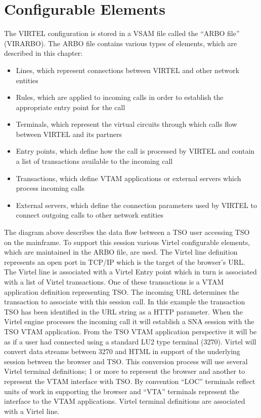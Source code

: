 \documentclass[letterpaper,10pt,english]{sphinxmanual}
\begin{document}
\section{Configurable Elements}
\label{\detokenize{connectivity_guide:configurable-elements}}
The VIRTEL configuration is stored in a VSAM file called the “ARBO file” (VIRARBO). The ARBO file contains various types of elements, which are described in this chapter:
\begin{itemize}
\item {} 
Lines, which represent connections between VIRTEL and other network entities

\item {} 
Rules, which are applied to incoming calls in order to establish the appropriate entry point for the call

\item {} 
Terminals, which represent the virtual circuits through which calls flow between VIRTEL and its partners

\item {} 
Entry points, which define how the call is processed by VIRTEL and contain a list of transactions available to the incoming call

\item {} 
Transactions, which define VTAM applications or external servers which process incoming calls

\item {} 
External servers, which define the connection parameters used by VIRTEL to connect outgoing calls to other network entities

\end{itemize}



The diagram above describes the data flow between a TSO user accessing TSO on the mainframe. To support this session various Virtel configurable elements, which are maintained in the ARBO file, are used. The Virtel line definition represents an open port in TCP/IP which is the target of the browser’s URL. The Virtel line is associated with a Virtel Entry point which in turn is associated with a list of Virtel transactions. One of these transactions is a VTAM application definition representing TSO. The incoming URL determines the transaction to associate with this session call. In this example the transaction TSO has been identified in the URL string as a HTTP parameter. When the Virtel engine processes the incoming call it will establish a SNA session with the TSO VTAM application. From the TSO VTAM application perspective it will be as if a user had connected using a standard LU2 type terminal (3270). Virtel will convert data streams between 3270 and HTML in support of the underlying session between the browser and TSO. This conversion process will use several Virtel terminal definitions; 1 or more to represent the browser and another to represent the VTAM interface with TSO. By convention “LOC” terminals reflect units of work in supporting the browser and “VTA” terminals represent the interface to the VTAM applications. Virtel terminal definitions are associated with a Virtel line.
\end{document}
